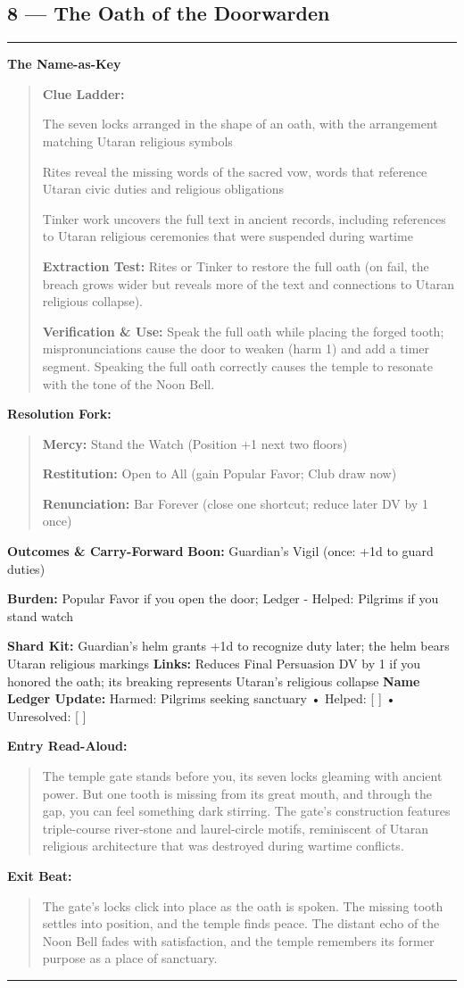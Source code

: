 \documentclass[18pt, letterpaper, twoside]{article}
\newenvironment{floorbox}[1]{%
    \begin{center}
    \begin{minipage}{0.95\textwidth}
    \subsection*{#1}
    \vspace{-0.5em}
    \rule{\textwidth}{0.5pt}
    \vspace{0.5em}
}{%
    \vspace{0.5em}
    \rule{\textwidth}{0.5pt}
    \end{minipage}
    \end{center}
}
\newenvironment{gmnote}[1]{%
    \vspace{0.5em}
    \noindent\textbf{#1}
    \begin{quote}
}{%
    \end{quote}
    \vspace{0.5em}
}
\newenvironment{resolutionbox}{%
    \vspace{0.5em}
    \noindent\textbf{Resolution Fork:}
    \begin{quote}
}{%
    \end{quote}
    \vspace{0.5em}
}
\newenvironment{boxedtext}[1]{%
    \vspace{0.5em}
    \noindent\textbf{#1}
    \begin{quote}
}{%
    \end{quote}
    \vspace{0.5em}
}
\newcommand{\boon}[1]{\noindent\textbf{Boon:} #1\par}
\newcommand{\burden}[1]{\noindent\textbf{Burden:} #1\par}
\newcommand{\entrytext}[1]{\begin{boxedtext}{Entry Read-Aloud:} #1 \end{boxedtext}}
\newcommand{\exittext}[1]{\begin{boxedtext}{Exit Beat:} #1 \end{boxedtext}}
\begin{document}
\begin{floorbox}{8 --- The Oath of the Doorwarden}
\begin{gmnote}{The Name-as-Key}
\textbf{Clue Ladder:}
\begin{description}[leftmargin=*, style=unboxed]
    \item[Gentle Nudge:] The seven locks arranged in the shape of an oath, with the arrangement matching Utaran religious symbols
    \item[Actionable Lead:] Rites reveal the missing words of the sacred vow, words that reference Utaran civic duties and religious obligations
    \item[Aha! Proof:] Tinker work uncovers the full text in ancient records, including references to Utaran religious ceremonies that were suspended during wartime
\end{description}

\textbf{Extraction Test:} Rites or Tinker to restore the full oath (on fail, the breach grows wider but reveals more of the text and connections to Utaran religious collapse).

\textbf{Verification \& Use:} Speak the full oath while placing the forged tooth; mispronunciations cause the door to weaken (harm 1) and add a timer segment. Speaking the full oath correctly causes the temple to resonate with the tone of the Noon Bell.
\end{gmnote}

\begin{resolutionbox}
\textbf{Mercy:} Stand the Watch (Position +1 next two floors)

\textbf{Restitution:} Open to All (gain Popular Favor; Club draw now)

\textbf{Renunciation:} Bar Forever (close one shortcut; reduce later DV by 1 once)
\end{resolutionbox}

\textbf{Outcomes \& Carry-Forward}
\boon{Guardian's Vigil (once: +1d to guard duties)}
\burden{Popular Favor if you open the door; Ledger - Helped: Pilgrims if you stand watch}
\textbf{Shard Kit:} Guardian's helm grants +1d to recognize duty later; the helm bears Utaran religious markings
\textbf{Links:} Reduces Final Persuasion DV by 1 if you honored the oath; its breaking represents Utaran's religious collapse
\textbf{Name Ledger Update:} Harmed: Pilgrims seeking sanctuary • Helped: [ ] • Unresolved: [ ]

\entrytext{The temple gate stands before you, its seven locks gleaming with ancient power. But one tooth is missing from its great mouth, and through the gap, you can feel something dark stirring. The gate's construction features triple-course river-stone and laurel-circle motifs, reminiscent of Utaran religious architecture that was destroyed during wartime conflicts.}

\exittext{The gate's locks click into place as the oath is spoken. The missing tooth settles into position, and the temple finds peace. The distant echo of the Noon Bell fades with satisfaction, and the temple remembers its former purpose as a place of sanctuary.}
\end{floorbox}
\end{document}
